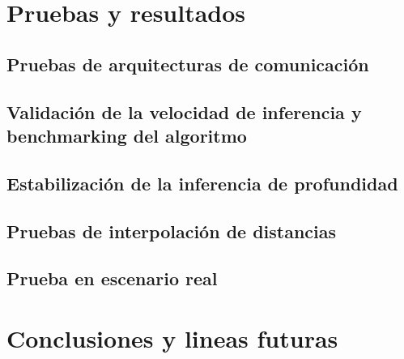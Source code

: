   \chapter{Pruebas y resultados}
    \section{Pruebas de arquitecturas de comunicación}
    \section{Validación de la velocidad de inferencia y benchmarking del algoritmo}
    \section{Estabilización de la inferencia de profundidad}
    \section{Pruebas de interpolación de distancias}
    \section{Prueba en escenario real}
  \chapter{Conclusiones y lineas futuras}